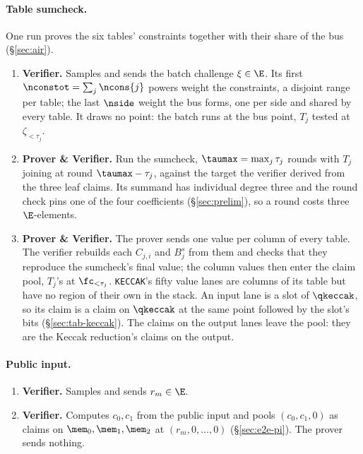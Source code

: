 \paragraph{Table sumcheck.} One run proves the six tables' constraints together with their share of the bus (\S\ref{sec:air}).
\begin{enumerate}
\item \textbf{Verifier.} Samples and sends the batch challenge $\xi\in\E$. Its first $\nconstot=\sum_j\ncons{j}$ powers weight the constraints, a disjoint range per table; the last $\nside$ weight the bus forms, one per side and shared by every table. It draws no point: the batch runs at the bus point, $T_j$ tested at $\zeta_{<\tau_j}$.
\item \textbf{Prover \& Verifier.} Run the sumcheck, $\taumax=\max_j\tau_j$ rounds with $T_j$ joining at round $\taumax-\tau_j$, against the target the verifier derived from the three leaf claims. Its summand has individual degree three and the round check pins one of the four coefficients (\S\ref{sec:prelim}), so a round costs three $\E$-elements.
\item \textbf{Prover \& Verifier.} The prover sends one value per column of every table. The verifier rebuilds each $C_{j,i}$ and $B^{s}_j$ from them and checks that they reproduce the sumcheck's final value; the column values then enter the claim pool, $T_j$'s at $\fc_{<\tau_j}$. \texttt{KECCAK}'s fifty value lanes are columns of its table but have no region of their own in the stack. An input lane is a slot of $\qkeccak$, so its claim is a claim on $\qkeccak$ at the same point followed by the slot's bits (\S\ref{sec:tab-keccak}). The claims on the output lanes leave the pool: they are the Keccak reduction's claims on the output.
\end{enumerate}

\paragraph{Public input.}

\begin{enumerate}
\item \textbf{Verifier.} Samples and sends $r_m\in\E$.
\item \textbf{Verifier.} Computes $c_0,c_1$ from the public input and pools $(c_0,c_1,0)$ as claims on $\mem_0,\mem_1,\mem_2$ at $(r_m,0,\dots,0)$ (\S\ref{sec:e2e-pi}). The prover sends nothing.
\end{enumerate}

